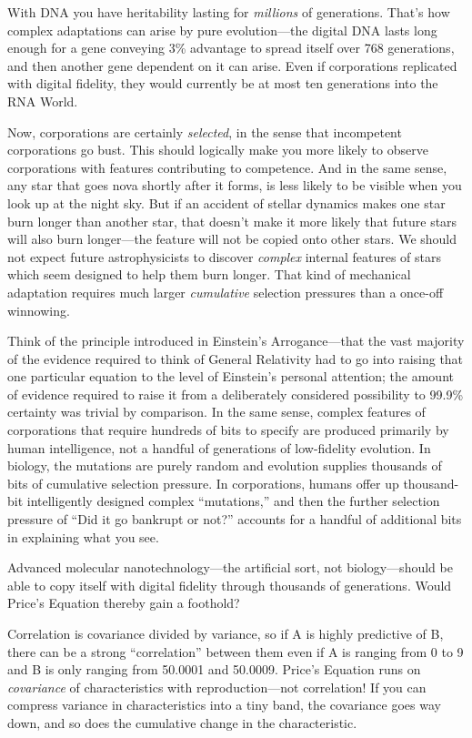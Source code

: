 {
 With DNA you have heritability lasting for \textit{millions} of
generations. That's how complex adaptations can arise
by pure evolution---the digital DNA lasts long enough for a gene
conveying 3\% advantage to spread itself over 768 generations, and then
another gene dependent on it can arise. Even if corporations replicated
with digital fidelity, they would currently be at most ten generations
into the RNA World.}

{
 Now, corporations are certainly \textit{selected}, in the sense
that incompetent corporations go bust. This should logically make you
more likely to observe corporations with features contributing to
competence. And in the same sense, any star that goes nova shortly
after it forms, is less likely to be visible when you look up at the
night sky. But if an accident of stellar dynamics makes one star burn
longer than another star, that doesn't make it more
likely that future stars will also burn longer---the feature will not
be copied onto other stars. We should not expect future astrophysicists
to discover \textit{complex} internal features of stars which seem
designed to help them burn longer. That kind of mechanical adaptation
requires much larger \textit{cumulative} selection pressures than a
once-off winnowing.}

{
 Think of the principle introduced in Einstein's
Arrogance---that the vast majority of the evidence required to think of
General Relativity had to go into raising that one particular equation
to the level of Einstein's personal attention; the
amount of evidence required to raise it from a deliberately considered
possibility to 99.9\% certainty was trivial by comparison. In the same
sense, complex features of corporations that require hundreds of bits
to specify are produced primarily by human intelligence, not a handful
of generations of low-fidelity evolution. In biology, the mutations are
purely random and evolution supplies thousands of bits of cumulative
selection pressure. In corporations, humans offer up thousand-bit
intelligently designed complex
``mutations,'' and then the further
selection pressure of ``Did it go bankrupt or
not?'' accounts for a handful of additional bits in
explaining what you see.}

{
 Advanced molecular nanotechnology---the artificial sort, not
biology---should be able to copy itself with digital fidelity through
thousands of generations. Would Price's Equation
thereby gain a foothold?}

{
 Correlation is covariance divided by variance, so if A is highly
predictive of B, there can be a strong
``correlation'' between them even if
A is ranging from 0 to 9 and B is only ranging from 50.0001 and
50.0009. Price's Equation runs on \textit{covariance}
of characteristics with reproduction---not correlation! If you can
compress variance in characteristics into a tiny band, the covariance
goes way down, and so does the cumulative change in the
characteristic.}

